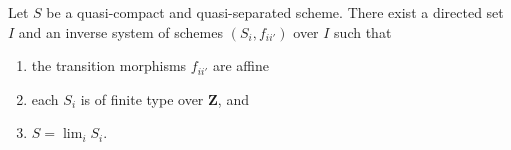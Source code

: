\begin{proposition}
\label{proposition-approximate}
Let $S$ be a quasi-compact and quasi-separated scheme.
There exist a directed set $I$
and an inverse system of schemes $(S_i, f_{ii'})$ over $I$
such that
\begin{enumerate}
\item the transition morphisms $f_{ii'}$ are affine
\item each $S_i$ is of finite type over $\mathbf{Z}$, and
\item $S = \lim_i S_i$.
\end{enumerate}
\end{proposition}